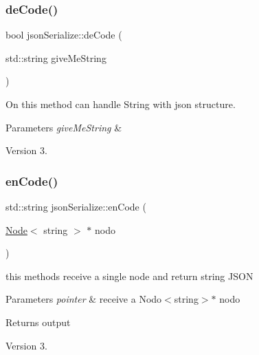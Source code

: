 \subsubsection{\texorpdfstring{de\+Code()}{deCode()}}
{\footnotesize\ttfamily bool json\+Serialize\+::de\+Code (\begin{DoxyParamCaption}\item[{std\+::string}]{give\+Me\+String }\end{DoxyParamCaption})\hspace{0.3cm}{\ttfamily [static]}}



On this method can handle String with json structure. 


\begin{DoxyParams}{Parameters}
{\em give\+Me\+String} & \\
\hline
\end{DoxyParams}
\begin{DoxyVersion}{Version}
3. 
\end{DoxyVersion}
\mbox{\label{classjson_serialize_aca3de79f890e13ca596346ea8db62049}} 
\subsubsection{\texorpdfstring{en\+Code()}{enCode()}\hspace{0.1cm}{\footnotesize\ttfamily [1/3]}}
{\footnotesize\ttfamily std\+::string json\+Serialize\+::en\+Code (\begin{DoxyParamCaption}\item[{\hyperlink{class_node}{Node}$<$ string $>$ $\ast$}]{nodo }\end{DoxyParamCaption})\hspace{0.3cm}{\ttfamily [static]}}



this methods receive a single node and return string J\+S\+ON 


\begin{DoxyParams}{Parameters}
{\em pointer} & receive a Nodo$<$string$>$$\ast$ nodo \\
\hline
\end{DoxyParams}
\begin{DoxyReturn}{Returns}
output 
\end{DoxyReturn}
\begin{DoxyVersion}{Version}
3. 
\end{DoxyVersion}
\mbox{\label{classjson_serialize_ab8babaccdc4b2930ffbf847d5505634b}} 
